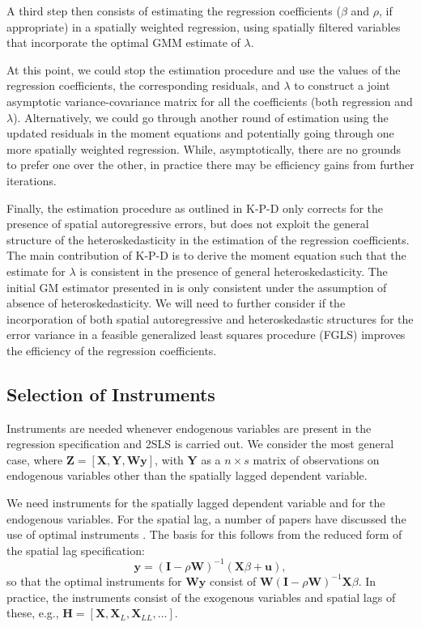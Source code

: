 \documentclass{article}
\begin{document}
A third step then consists of estimating the regression coefficients ($\beta$ and $\rho$, if
appropriate) in a spatially weighted regression, using spatially filtered variables that incorporate the
optimal GMM estimate of $\lambda$.

At this point, we could stop the estimation procedure and use the values of the regression
coefficients, the corresponding residuals, and $\lambda$ to construct a joint asymptotic 
variance-covariance matrix for all the coefficients (both regression and $\lambda$).
Alternatively, we could go through another round of estimation using the updated residuals
in the moment equations and potentially going through one more spatially weighted 
regression. While, asymptotically, there are no grounds to prefer one over the other, in
practice there may be efficiency gains from further iterations.

Finally, the estimation procedure as outlined in K-P-D only corrects for the presence of
spatial autoregressive errors, but does not exploit the general structure of the 
heteroskedasticity in the estimation of the regression coefficients. The main contribution
of K-P-D is to derive the moment equation such that the estimate for $\lambda$ is
consistent in the presence of general heteroskedasticity. The initial GM estimator presented
in \cite{KelejianPrucha:98,KelejianPrucha:99a} is only consistent under the assumption
of absence of heteroskedasticity. We will need to further consider if the incorporation of
both spatial autoregressive and heteroskedastic structures for the error variance 
in a feasible generalized least squares procedure (FGLS)
improves the efficiency of the regression coefficients.

\subsection{Selection of Instruments}
Instruments are needed whenever endogenous variables are present in the
regression specification and 2SLS is carried out. We consider the most
general case, where $\mathbf{Z} = [ \mathbf{X}, \mathbf{Y}, \mathbf{Wy} ]$, with
$\mathbf{Y}$ as a $n \times s$ matrix of observations on endogenous variables
other than the spatially lagged dependent variable.

We need instruments for the spatially lagged dependent variable and for the endogenous
variables. For the spatial lag,
a number of papers have discussed the use of optimal instruments
\cite[e.g.,][]{Lee:03,Dasetal:03,Kelejianetal:04,Lee:07}. 
The basis for this follows from the reduced form of the spatial lag
specification:
\begin{equation*}
\mathbf{y} = (\mathbf{I} - \rho \mathbf{W} )^{-1} (\mathbf{X}\beta + \mathbf{u}),
\end{equation*}
so that the optimal instruments for $\mathbf{Wy}$ consist of $\mathbf{W}(\mathbf{I} - \rho \mathbf{W} )^{-1} \mathbf{X}\beta$. In practice, the instruments
consist of the exogenous variables and spatial lags of these, e.g., 
$\mathbf{H} = [ \mathbf{X}, \mathbf{X}_L, \mathbf{X}_{LL}, \dots ]$.
\end{document}
